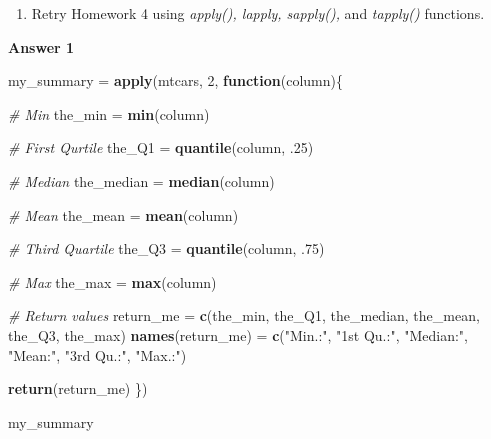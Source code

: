\documentclass[
]{book}
\newenvironment{Shaded}{\begin{snugshade}}{\end{snugshade}}
\newcommand{\CommentTok}[1]{\textcolor[rgb]{0.56,0.35,0.01}{\textit{#1}}}
\newcommand{\ControlFlowTok}[1]{\textcolor[rgb]{0.13,0.29,0.53}{\textbf{#1}}}
\newcommand{\DecValTok}[1]{\textcolor[rgb]{0.00,0.00,0.81}{#1}}
\newcommand{\FloatTok}[1]{\textcolor[rgb]{0.00,0.00,0.81}{#1}}
\newcommand{\KeywordTok}[1]{\textcolor[rgb]{0.13,0.29,0.53}{\textbf{#1}}}
\newcommand{\NormalTok}[1]{#1}
\newcommand{\StringTok}[1]{\textcolor[rgb]{0.31,0.60,0.02}{#1}}
\providecommand{\tightlist}{%
  \setlength{\itemsep}{0pt}\setlength{\parskip}{0pt}}
\begin{document}
\begin{enumerate}
\def\labelenumi{\arabic{enumi})}
\setcounter{enumi}{1}
\tightlist
\item
  Retry Homework 4 using \emph{apply(), lapply, sapply(),} and \emph{tapply()} functions.
\end{enumerate}

\newpage

\textbf{Answer 1}

\begin{Shaded}
\begin{Highlighting}[]
\NormalTok{my_summary =}\StringTok{ }\KeywordTok{apply}\NormalTok{(mtcars, }\DecValTok{2}\NormalTok{, }\ControlFlowTok{function}\NormalTok{(column)\{}
  
  \CommentTok{# Min}
\NormalTok{  the_min =}\StringTok{ }\KeywordTok{min}\NormalTok{(column)}
  
  \CommentTok{# First Qurtile}
\NormalTok{  the_Q1 =}\StringTok{ }\KeywordTok{quantile}\NormalTok{(column, }\FloatTok{.25}\NormalTok{)}
  
  \CommentTok{# Median}
\NormalTok{  the_median =}\StringTok{ }\KeywordTok{median}\NormalTok{(column)}
  
  \CommentTok{# Mean }
\NormalTok{  the_mean =}\StringTok{ }\KeywordTok{mean}\NormalTok{(column)}
  
  \CommentTok{# Third Quartile}
\NormalTok{  the_Q3 =}\StringTok{ }\KeywordTok{quantile}\NormalTok{(column, }\FloatTok{.75}\NormalTok{)}
  
  \CommentTok{# Max}
\NormalTok{  the_max =}\StringTok{ }\KeywordTok{max}\NormalTok{(column)}
  
  \CommentTok{# Return values}
\NormalTok{  return_me =}\StringTok{ }\KeywordTok{c}\NormalTok{(the_min, the_Q1, the_median,}
\NormalTok{                the_mean, the_Q3, the_max)}
  \KeywordTok{names}\NormalTok{(return_me) =}\StringTok{ }\KeywordTok{c}\NormalTok{(}\StringTok{"Min.:"}\NormalTok{, }\StringTok{"1st Qu.:"}\NormalTok{, }
                       \StringTok{"Median:"}\NormalTok{, }\StringTok{"Mean:"}\NormalTok{, }
                       \StringTok{"3rd Qu.:"}\NormalTok{, }\StringTok{"Max.:"}\NormalTok{)}
  
  \KeywordTok{return}\NormalTok{(return_me)}
\NormalTok{\})}

\NormalTok{my_summary}
\end{Highlighting}
\end{Shaded}
\end{document}

